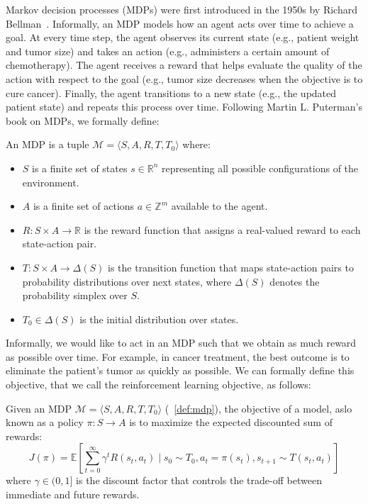 Markov decision processes (MDPs) were first introduced in the 1950s by Richard Bellman~\cite{Bellman}.
Informally, an MDP models how an agent acts over time to achieve a goal. 
At every time step, the agent observes its current state (e.g., patient weight and tumor size) and takes an action (e.g., administers a certain amount of chemotherapy).
The agent receives a reward that helps evaluate the quality of the action with respect to the goal (e.g., tumor size decreases when the objective is to cure cancer).
Finally, the agent transitions to a new state (e.g., the updated patient state) and repeats this process over time. 
Following Martin L. Puterman's book on MDPs\cite{puterman}, we formally define:
\begin{definition}\label{def:mdp} An MDP is a tuple $\mathcal{M} = \langle S, A, R, T, T_0 \rangle$ where:
\begin{itemize}
\item $S$ is a finite set of states $s \in \mathbb{R}^n$ representing all possible configurations of the environment.
\item $A$ is a finite set of actions $a \in \mathbb{Z}^m$ available to the agent.
\item $R: S \times A \rightarrow \mathbb{R}$ is the reward function that assigns a real-valued reward to each state-action pair.
\item $T: S \times A \rightarrow \Delta(S)$ is the transition function that maps state-action pairs to probability distributions over next states, where $\Delta(S)$ denotes the probability simplex over $S$.
\item $T_0 \in \Delta(S)$ is the initial distribution over states.
\end{itemize}
\end{definition}

Informally, we would like to act in an MDP such that we obtain as much reward as possible over time.
For example, in cancer treatment, the best outcome is to eliminate the patient's tumor as quickly as possible.
We can formally define this objective, that we call the reinforcement learning objective, as follows:

\begin{definition}\label{def:mdp-obj} Given an MDP $\mathcal{M}=\langle S, A, R, T, T_0 \rangle$ (~\ref{def:mdp}), the objective of a model, aslo known as a policy $\pi: S \rightarrow A$ is to maximize the expected discounted sum of rewards:
$$J(\pi) = \mathbb{E}\left[\sum_{t=0}^{\infty} \gamma^t R(s_t, a_t) \mid s_0 \sim T_0, a_t = \pi(s_t), s_{t+1} \sim T(s_t, a_t)\right]$$
where $\gamma \in (0,1]$ is the discount factor that controls the trade-off between immediate and future rewards.
\end{definition}


